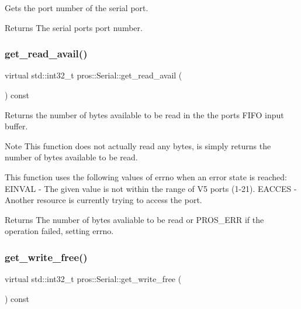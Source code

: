 Gets the port number of the serial port.

\begin{DoxyReturn}{Returns}
The serial port\textquotesingle{}s port number. 
\end{DoxyReturn}
\mbox{\label{classpros_1_1Serial_aca502997319088ea71cf870fbbca7eb8}} 
\subsubsection{\texorpdfstring{get\+\_\+read\+\_\+avail()}{get\_read\_avail()}}
{\footnotesize\ttfamily virtual std\+::int32\+\_\+t pros\+::\+Serial\+::get\+\_\+read\+\_\+avail (\begin{DoxyParamCaption}{ }\end{DoxyParamCaption}) const\hspace{0.3cm}{\ttfamily [virtual]}}

Returns the number of bytes available to be read in the the port\textquotesingle{}s F\+I\+FO input buffer.

\begin{DoxyNote}{Note}
This function does not actually read any bytes, is simply returns the number of bytes available to be read.
\end{DoxyNote}
This function uses the following values of errno when an error state is reached\+: E\+I\+N\+V\+AL -\/ The given value is not within the range of V5 ports (1-\/21). E\+A\+C\+C\+ES -\/ Another resource is currently trying to access the port.

\begin{DoxyReturn}{Returns}
The number of bytes avaliable to be read or P\+R\+O\+S\+\_\+\+E\+RR if the operation failed, setting errno. 
\end{DoxyReturn}
\mbox{\label{classpros_1_1Serial_a08daf4a3df3e3c4924d66d0b2eb91538}} 
\subsubsection{\texorpdfstring{get\+\_\+write\+\_\+free()}{get\_write\_free()}}
{\footnotesize\ttfamily virtual std\+::int32\+\_\+t pros\+::\+Serial\+::get\+\_\+write\+\_\+free (\begin{DoxyParamCaption}{ }\end{DoxyParamCaption}) const\hspace{0.3cm}{\ttfamily [virtual]}}

